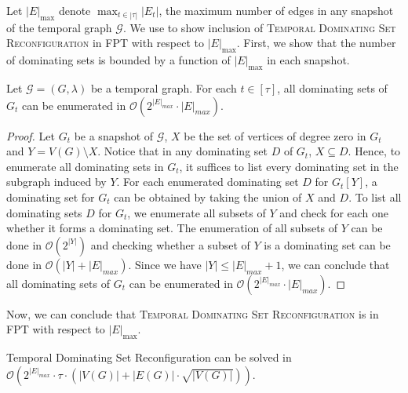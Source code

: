 
Let $|E|_{\max}$ denote $\max_{t\in |\tau|}|E_t|$, the maximum number of edges in any snapshot of the temporal graph $\mathcal{G}$.
We use  to show inclusion of \textsc{Temporal Dominating Set Reconfiguration} in FPT with respect to $|E|_{\max}$. First, we show that the number of dominating sets is bounded by a function of $|E|_{\max}$ in each snapshot.

\begin{lemmarep}
  Let $\mathcal{G}=(G,\lambda)$ be a temporal graph. For each $t \in [\tau]$, all dominating sets of $G_t$ can be enumerated in $\mathcal{O}(2^{|E|_{max}} \cdot |E|_{max})$.
\end{lemmarep}

\begin{proof}
  Let $G_t$ be a snapshot of $\mathcal{G}$, $X$ be the set of vertices of degree zero in $G_t$ and $Y = V(G) \setminus X$. 
  Notice that in any dominating set $D$ of $G_t$, $X \subseteq D$. Hence, to enumerate all dominating sets in $G_t$, it suffices to list every dominating set in the subgraph induced by $Y$.  For each enumerated dominating set $D$ for $G_t[Y]$, a dominating set for $G_t$ can be obtained by taking the union of $X$ and $D$.
  To list all dominating sets $D$ for $G_t$, we enumerate all subsets of $Y$ and check for each one whether it forms a dominating set. The enumeration of all subsets of $Y$ can be done in $\mathcal{O}(2^{|Y|})$ and checking whether a subset of $Y$ is a dominating set can be done in $\mathcal{O}(|Y| + |E|_{max})$.
  Since we have $|Y| \leq |E|_{max} +1$, we can conclude that all dominating sets of $G_t$ can be enumerated in $\mathcal{O}(2^{|E|_{max}} \cdot |E|_{max})$.
\end{proof}

\noindent Now, we can conclude that \textsc{Temporal Dominating Set Reconfiguration} is in FPT with respect to $|E|_{\max}$.

\begin{corollary}
{\sc Temporal Dominating Set Reconfiguration} can be solved in $\mathcal{O}(2^{|E|_{max}} \cdot \tau \cdot (|V(G)|+|E(G)|\cdot\sqrt{|V(G)|}))$.
\end{corollary}


